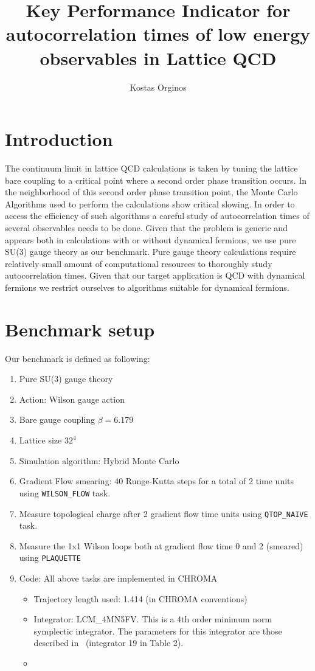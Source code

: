 \documentclass[11pt,a4paper]{article}
\title{Key Performance Indicator for autocorrelation times of low energy observables in Lattice QCD}
\author[a,b]{Kostas Orginos}
\affiliation[a]{Physics Department, College of William and Mary,
Williamsburg, Virginia 23187, U.S.A.}
\affiliation[b]{Thomas Jefferson National Accelerator Facility, Newport News, 
Virginia 23606, U.S.A.}
\begin{document}
\maketitle

\section{Introduction}

The continuum limit in lattice QCD calculations is taken by tuning the lattice bare coupling to a  critical point where a second order phase transition occurs. In the neighborhood of this second order phase transition point, the Monte Carlo Algorithms used to perform the calculations show critical slowing. In order to access the efficiency of such algorithms a careful study of autocorrelation times of several observables needs to be done.
Given that the problem is generic and appears both in calculations with or without dynamical fermions,  we use pure SU(3) gauge theory as our benchmark. Pure gauge theory calculations require relatively small amount of computational resources to thoroughly study autocorrelation times. Given that our target application is QCD with dynamical fermions we restrict ourselves to algorithms suitable for dynamical fermions.
 
\section{Benchmark setup}

Our benchmark is defined as following:
\begin{enumerate}
\item Pure SU(3) gauge theory
\item Action: Wilson gauge action
\item Bare gauge coupling $\beta=6.179$
\item Lattice size $32^4$
\item Simulation algorithm: Hybrid Monte Carlo 
\item Gradient Flow smearing: 40 Runge-Kutta steps for a total of 2 time units using {\tt WILSON\_FLOW} task. 
\item Measure topological charge after 2 gradient flow time units using {\tt QTOP\_NAIVE} task.
\item Measure the 1x1 Wilson loops both at gradient flow time 0 and 2 (smeared) using {\tt PLAQUETTE}
\item Code: All above tasks are implemented in CHROMA~\cite{Edwards:2004sx}
\begin{itemize}
\item Trajectory length used: 1.414 (in CHROMA conventions)
\item Integrator: LCM\_4MN5FV. This is a 4th order minimum norm symplectic integrator. The parameters for this integrator are those described in~\cite{OMELYAN2003272} (integrator 19 in Table 2).
\item 
\end{itemize}
\end{enumerate}
\end{document}
